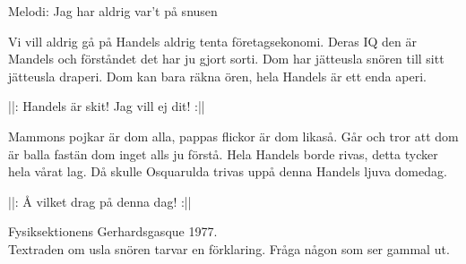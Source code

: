 \begin{song}

\begin{songmeta}
Melodi: Jag har aldrig var't på snusen
\end{songmeta}

\begin{songtext}
Vi vill aldrig gå på Handels
aldrig tenta företagsekonomi.
Deras IQ den är Mandels
och förståndet det har ju gjort sorti.
Dom har jätteusla snören
till sitt jätteusla draperi.
Dom kan bara räkna ören,
hela Handels är ett enda aperi.

||: Handels är skit! \textendash{} Jag vill ej dit! :||

Mammons pojkar är dom alla,
pappas flickor är dom likaså.
Går och tror att dom är balla
fastän dom inget alls ju förstå.
Hela Handels borde rivas,
detta tycker hela vårat lag.
Då skulle Osquarulda trivas
uppå denna Handels ljuva domedag.

||: Å vilket drag \textendash{} på denna dag! :||
\end{songtext}

\begin{songnotes}
Fysiksektionens Gerhardsgasque 1977.\\
Textraden om usla snören tarvar en förklaring. Fråga någon som ser gammal ut.
\end{songnotes}

\end{song}
